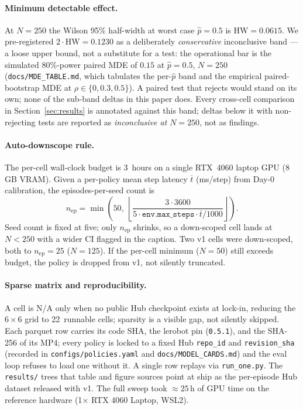 \documentclass[10pt]{article}
\begin{document}
\paragraph{Minimum detectable effect.}
At $N{=}250$ the Wilson 95\% half-width at worst case $\hat{p}{=}0.5$ is
$\text{HW}=0.0615$. We pre-registered $2\cdot\text{HW} = 0.1230$ as a
deliberately \emph{conservative} inconclusive band --- a loose upper
bound, not a substitute for a test: the operational bar is the simulated
80\%-power paired MDE of $0.15$ at $\hat{p}{=}0.5$, $N{=}250$
(\texttt{docs/MDE\_TABLE.md}, which tabulates the per-$\hat{p}$ band and
the empirical paired-bootstrap MDE at $\rho\in\{0,0.3,0.5\}$). A paired
test that rejects would stand on its own; none of the sub-band deltas in
this paper does. Every cross-cell comparison in
Section~\ref{sec:results} is annotated against this band; deltas
below it with non-rejecting tests are reported as \emph{inconclusive at
$N{=}250$}, not as findings.

\paragraph{Auto-downscope rule.}
\label{sec:downscope}
The per-cell wall-clock budget is 3~hours on a single RTX~4060 laptop
GPU (8\,GB VRAM). Given a per-policy mean step latency $\overline{t}$
(ms/step) from Day-0 calibration, the episodes-per-seed count is
\begin{equation}
    n_\text{ep} = \min\!\left(50,\ \left\lfloor
        \frac{3 \cdot 3600}{5 \cdot \texttt{env.max\_steps} \cdot
        \overline{t} / 1000} \right\rfloor\right).
\end{equation}
Seed count is fixed at five; only $n_\text{ep}$ shrinks, so a
down-scoped cell lands at $N{<}250$ with a wider CI flagged in
the caption. Two v1 cells were down-scoped, both to
$n_\text{ep}{=}25$ ($N{=}125$). If the per-cell
minimum ($N{=}50$) still exceeds budget, the policy is dropped from v1,
not silently truncated.

\paragraph{Sparse matrix and reproducibility.}
A cell is N/A only when no public Hub checkpoint exists at lock-in,
reducing the $6\times6$ grid to 22~runnable cells; sparsity is a visible
gap, not silently skipped. Each parquet row carries its code SHA, the
lerobot pin (\texttt{0.5.1}), and the SHA-256 of its MP4; every policy is
locked to a fixed Hub \texttt{repo\_id} and \texttt{revision\_sha}
(recorded in \texttt{configs/policies.yaml} and
\texttt{docs/MODEL\_CARDS.md}) and the eval loop refuses to load
one without it. A single row replays via \texttt{run\_one.py}. The
\texttt{results/} trees that table and figure sources point at ship as
the per-episode Hub dataset released with v1. The full
sweep took $\approx 25$\,h of GPU time on the reference hardware
(1$\times$ RTX 4060 Laptop, WSL2).
\end{document}
